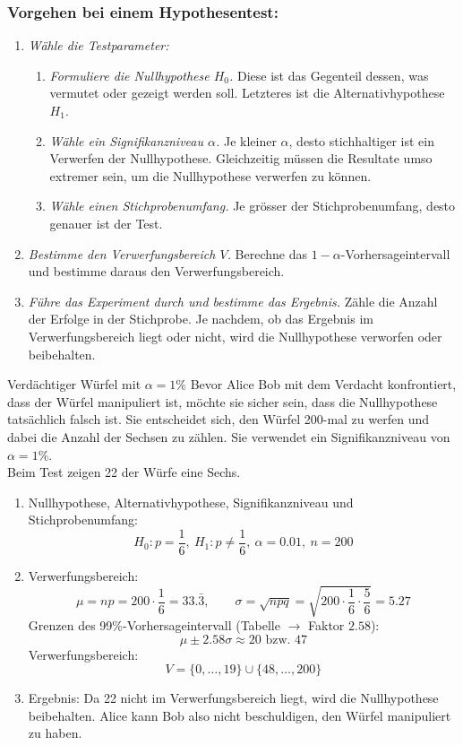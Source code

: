 \subsubsection*{Vorgehen bei einem Hypothesentest:}
\begin{enumerate}
    \item \emph{Wähle die Testparameter:}
          \begin{enumerate}
              \item \emph{Formuliere die Nullhypothese \(H_0\).} Diese ist das Gegenteil dessen, was vermutet oder gezeigt werden soll. Letzteres ist die Alternativhypothese \(H_1\).
              \item \emph{Wähle ein Signifikanzniveau \(\alpha\).} Je kleiner \(\alpha\), desto stichhaltiger ist ein Verwerfen der Nullhypothese. Gleichzeitig müssen die Resultate umso extremer sein, um die Nullhypothese verwerfen zu können.
              \item \emph{Wähle einen Stichprobenumfang.} Je grösser der Stichprobenumfang, desto genauer ist der Test.
          \end{enumerate}
    \item \emph{Bestimme den Verwerfungsbereich \(V\).} Berechne das \(1-\alpha\)-Vorhersageintervall und bestimme daraus den Verwerfungsbereich.
    \item \emph{Führe das Experiment durch und bestimme das Ergebnis.} Zähle die Anzahl der Erfolge in der Stichprobe. Je nachdem, ob das Ergebnis im Verwerfungsbereich liegt oder nicht, wird die Nullhypothese verworfen oder beibehalten.
\end{enumerate}
\begin{bsp}
    {Verdächtiger Würfel mit \(\alpha = 1\%\)}{}
    Bevor Alice Bob mit dem Verdacht konfrontiert, dass der Würfel manipuliert ist, möchte sie sicher sein, dass die Nullhypothese tatsächlich falsch ist. Sie entscheidet sich, den Würfel 200-mal zu werfen und dabei die Anzahl der Sechsen zu zählen. Sie verwendet ein Signifikanzniveau von \(\alpha = 1\%\). \\
    Beim Test zeigen 22 der Würfe eine Sechs.

    \begin{enumerate}
        \item Nullhypothese, Alternativhypothese, Signifikanzniveau und Stichprobenumfang:
              \[H_0: p = \frac{1}{6},\ H_1: p \neq \frac{1}{6},\ \alpha = 0.01,\ n = 200\]
        \item Verwerfungsbereich:
              \[\mu = np = 200 \cdot \frac{1}{6} = 33.\bar{3}, \qquad \sigma = \sqrt{npq} = \sqrt{200 \cdot \frac{1}{6} \cdot \frac{5}{6}} = 5.27\]
              Grenzen des 99\%-Vorhersageintervall (Tabelle \(\to\) Faktor \(2.58\)):
              \[\mu\pm2.58\sigma \approx 20 \text{ bzw. } 47\]
              Verwerfungsbereich:
              \[V = \{0, \dots, 19\} \cup \{48, \dots, 200\}\]
        \item Ergebnis:
              Da 22 nicht im Verwerfungsbereich liegt, wird die Nullhypothese beibehalten. Alice kann Bob also nicht beschuldigen, den Würfel manipuliert zu haben.
    \end{enumerate}

\end{bsp}
